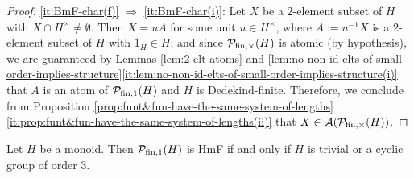 \begin{proof}
	
	
	\ref{it:BmF-char(f)} $\Rightarrow$ \ref{it:BmF-char(i)}: Let $X$ be a $2$-element subset of $H$ with $X \cap H^\times \ne \emptyset$. Then $X = uA$ for some unit $u \in H^\times$, where $A := u^{-1}X$ is a $2$-element subset of $H$ with $1_H \in H$; and since $\mathcal P_{\textrm{fin},\times}(H)$ is atomic (by hypothesis), we are guaranteed by Lemmas \ref{lem:2-elt-atoms} and \ref{lem:no-non-id-elts-of-small-order-implies-structure}\ref{it:lem:no-non-id-elts-of-small-order-implies-structure(i)} that $A$ is an atom of $\mathcal P_{\textrm{fin}, 1}(H)$ and $H$ is Dedekind-finite. Therefore, we conclude from Proposition \ref{prop:funt&fun-have-the-same-system-of-lengths}\ref{it:prop:funt&fun-have-the-same-system-of-lengths(ii)} that $X \in \mathcal{A}(\mathcal P_{\textrm{fin}, \times}(H))$.
\end{proof}

\begin{thm}\label{prop:HF-exp-3}
	Let $H$ be a monoid. Then $\mathcal P_{\textrm{fin}, 1}(H)$ is \textup{HmF} if and only if $H$ is trivial or a cyclic group of order $3$.
\end{thm}

